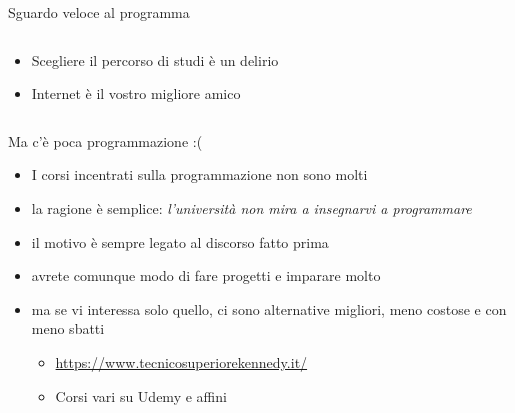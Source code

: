 \documentclass[aspectratio=1610]{beamer}
\begin{document}
\begin{frame}{Sguardo veloce al programma}
{\begin{columns}
\begin{column}{0.4\textwidth}
\begin{figure}
					\end{figure}
					\vfill
					\begin{itemize}
						\item<7-> Scegliere il percorso di studi è un delirio
						\item<8-> Internet è il vostro migliore amico
					\end{itemize}
				\end{column}
				\end{columns}
		}
	\end{frame}

	\begin{frame}{Ma c'è poca programmazione :(}
		\begin{itemize}
			\item<2-> I corsi incentrati sulla programmazione non sono molti
			\item<3-> la ragione è semplice: \emph{l'università non mira a insegnarvi a programmare}
			\item<4-> il motivo è sempre legato al discorso fatto prima
			\item<5-> avrete comunque modo di fare progetti e imparare molto
			\item<6-> ma se vi interessa solo quello, ci sono alternative migliori, meno costose e con meno sbatti
			\begin{itemize}
				\item<7-> \url{https://www.tecnicosuperiorekennedy.it/}
				\item<7-> Corsi vari su Udemy e affini
			\end{itemize}
		\end{itemize}
	\end{frame}
\end{document}
